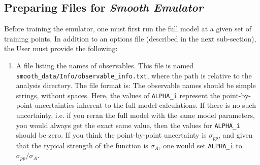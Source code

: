 \documentclass[UserManual.tex]{subfiles}
\begin{document}
\begin{sloppypar}
\subsection{Preparing Files for {\it Smooth Emulator}}

Before training the emulator, one must first run the full model at a given set of training points. In addition to an options file (described in the next sub-section), the User must provide the following:


\begin{enumerate}\itemsep=0pt
\item A file listing the names of observables. This file is named\\{\tt smooth\_data/Info/observable\_info.txt}, where the path is relative to the analysis directory. The file format is:
\vspace*{-8pt}{\tt \begin{Verbatim}[commandchars=\\\{\}]
   observable_name_1   ALPHA_1
   observable_name_2   ALPHA_1
   .
   observable_name_n   ALPHA_N
\end{Verbatim}
}\vspace*{-8pt}
The observable names should be simple strings, without spaces. Here, the values of {\tt ALPHA\_i} represent the point-by-point uncertainties inherent to the full-model calculations. If there is no such uncertainty, i.e. if you reran the full model with the same model parameters, you would always get the exact same value, then the values for {\tt ALPHA\_i} should be zero. If you think the point-by-point uncertainty is $\sigma_{pp}$, and given that the typical strength of the function is $\sigma_A$, one would set {\tt ALPHA\_i} to $\sigma_{pp}/\sigma_A$.


\end{enumerate}
\end{sloppypar}
\end{document}
